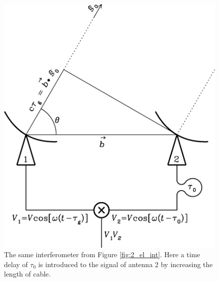 \begin{figure}[ht]
    \centering
    \includegraphics[width=0.75\columnwidth]{Images/2_elem_int_delay.png}
    \caption[A two element interferometer with a time delay added to one signa.]{The same interferometer from Figure \ref{fig:2_el_int}. Here a time delay of $\tau_0$ is introduced to the signal of antenna 2 by increasing the length of cable.}
    \label{fig:2_el_int_delay}
\end{figure}

